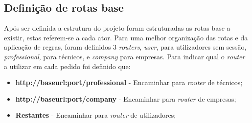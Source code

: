 \subsection{Definição de rotas base}
Após ser definida a estrutura do projeto foram estruturadas as rotas base a existir, estas referem-se a cada ator. Para uma melhor organização das rotas e da aplicação de regras, foram definidos 3 \textit{routers}, \textit{user}, para utilizadores sem sessão, \textit{professional}, para técnicos, e \textit{company} para empresas. Para indicar qual o \textit{router} a utilizar em cada pedido foi definido que:
\begin{itemize}
 \item \textbf{http://baseurl:port/professional} - Encaminhar para \textit{router} de técnicos;
 \item \textbf{http://baseurl:port/company} - Encaminhar para \textit{router} de empresas;
 \item \textbf{Restantes} - Encaminhar para \textit{router} de utilizadores;
\end{itemize}
